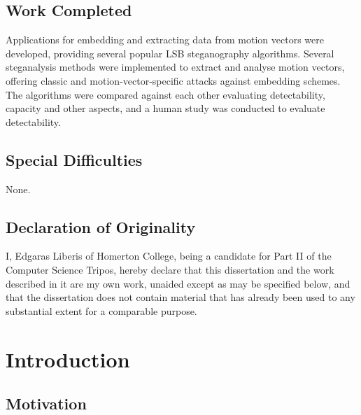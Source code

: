 \documentclass[12pt,british,twoside,notitlepage,usenames,dvipsnames,hypens,final]{report}
\renewcommand\thesubsection{\arabic{subsection}.}
\numberwithin{equation}{section}
\numberwithin{figure}{section}
\begin{document}
\section*{Work Completed}

Applications for embedding and extracting data from motion vectors were developed, providing several popular LSB steganography algorithms. Several steganalysis methods were implemented to extract and analyse motion vectors, offering classic and motion-vector-specific attacks against embedding schemes. The algorithms were compared against each other evaluating detectability, capacity and other aspects, and a human study was conducted to evaluate detectability.

\section*{Special Difficulties}

None.

\cleardoublepage

\section*{Declaration of Originality}
I, Edgaras Liberis of Homerton College, being a candidate for Part II of the Computer Science Tripos, hereby declare that this dissertation and the work described in it are my own work, unaided except as may be specified below, and that the dissertation does not contain material that has already been used to any substantial extent for a comparable purpose.

\bigskip
{}

\medskip
{}

\cleardoublepage
\tableofcontents
\renewcommand{\thesection}{\arabic{chapter}.\arabic{section}}
\renewcommand{\thesubsection}{\arabic{chapter}.\arabic{section}.\arabic{subsection}}
\setcounter{chapter}{0}

\cleardoublepage
\chapter{Introduction}
\pagestyle{headings}

\section{Motivation}
\label{motivation}
\end{document}
